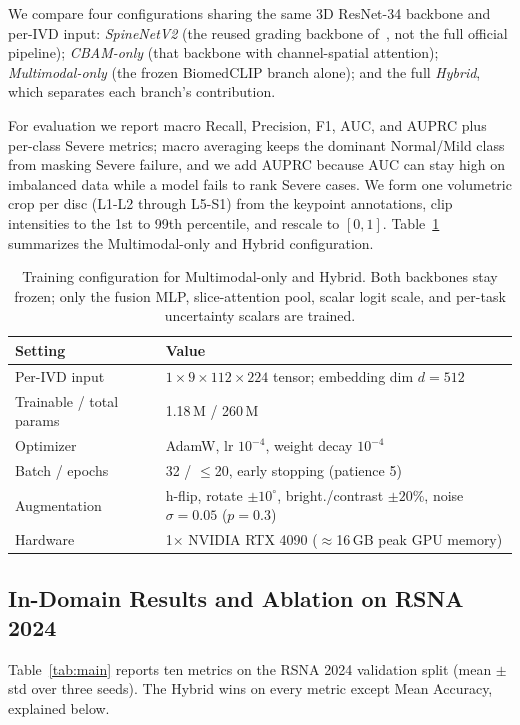 \documentclass[runningheads]{llncs}
\begin{document}
We compare four configurations sharing the same 3D ResNet-34 backbone and per-IVD input: \emph{SpineNetV2} (the reused grading backbone of~\cite{windsor2022}, not the full official pipeline); \emph{CBAM-only} (that backbone with channel-spatial attention); \emph{Multimodal-only} (the frozen BiomedCLIP branch alone); and the full \emph{Hybrid}, which separates each branch's contribution.

For evaluation we report macro Recall, Precision, F1, AUC, and AUPRC plus per-class Severe metrics; macro averaging keeps the dominant Normal/Mild class from masking Severe failure, and we add AUPRC because AUC can stay high on imbalanced data while a model fails to rank Severe cases. We form one volumetric crop per disc (L1-L2 through L5-S1) from the keypoint annotations, clip intensities to the 1st to 99th percentile, and rescale to $[0,1]$. Table~\ref{tab:config} summarizes the Multimodal-only and Hybrid configuration.

\begin{table}[t]
\centering
\caption{Training configuration for Multimodal-only and Hybrid. Both backbones stay frozen; only the fusion MLP, slice-attention pool, scalar logit scale, and per-task uncertainty scalars are trained.}
\label{tab:config}
\footnotesize
\begin{tabular}{@{}l p{8.1cm}@{}}
\toprule
\textbf{Setting} & \textbf{Value} \\
\midrule
Per-IVD input & $1\times9\times112\times224$ tensor; embedding dim $d=512$ \\
Trainable / total params & 1.18\,M / 260\,M \\
Optimizer & AdamW, lr $10^{-4}$, weight decay $10^{-4}$ \\
Batch / epochs & 32 / $\leq$20, early stopping (patience 5) \\
Augmentation & h-flip, rotate $\pm10^{\circ}$, bright./contrast $\pm20\%$, noise $\sigma{=}0.05$ ($p{=}0.3$) \\
Hardware & 1$\times$ NVIDIA RTX 4090 ($\approx$16\,GB peak GPU memory) \\
\bottomrule
\end{tabular}
\end{table}

\subsection{In-Domain Results and Ablation on RSNA 2024}\label{exp2}

Table~\ref{tab:main} reports ten metrics on the RSNA 2024 validation split (mean $\pm$ std over three seeds). The Hybrid wins on every metric except Mean Accuracy, explained below.
\end{document}
